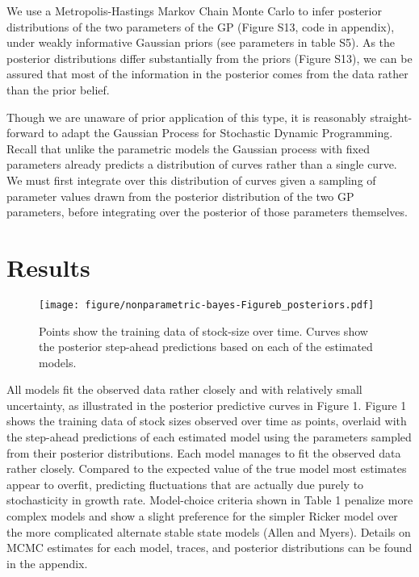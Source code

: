 \documentclass[author-year, review]{elsarticle} %
\makeatletter
\def\maxwidth{\ifdim\Gin@nat@width>\linewidth\linewidth
\else\Gin@nat@width\fi}
\let\Oldincludegraphics\includegraphics
\renewcommand{\includegraphics}[1]{\Oldincludegraphics[width=\maxwidth]{#1}}
\makeatother
\begin{document}
We use a Metropolis-Hastings Markov Chain Monte Carlo to infer posterior
distributions of the two parameters of the GP (Figure S13, code in
appendix), under weakly informative Gaussian priors (see parameters in
table S5). As the posterior distributions differ substantially from the
priors (Figure S13), we can be assured that most of the information in
the posterior comes from the data rather than the prior belief.

Though we are unaware of prior application of this type, it is
reasonably straight-forward to adapt the Gaussian Process for Stochastic
Dynamic Programming. Recall that unlike the parametric models the
Gaussian process with fixed parameters already predicts a distribution
of curves rather than a single curve. We must first integrate over this
distribution of curves given a sampling of parameter values drawn from
the posterior distribution of the two GP parameters, before integrating
over the posterior of those parameters themselves.

\section{Results}\label{results}

\begin{figure}[htbp]
\centering
\texttt{[image: figure/nonparametric-bayes-Figureb\_posteriors.pdf]}
\caption{Points show the training data of stock-size over time. Curves
show the posterior step-ahead predictions based on each of the estimated
models.}
\end{figure}

All models fit the observed data rather closely and with relatively
small uncertainty, as illustrated in the posterior predictive curves in
Figure 1. Figure 1 shows the training data of stock sizes observed over
time as points, overlaid with the step-ahead predictions of each
estimated model using the parameters sampled from their posterior
distributions. Each model manages to fit the observed data rather
closely. Compared to the expected value of the true model most estimates
appear to overfit, predicting fluctuations that are actually due purely
to stochasticity in growth rate. Model-choice criteria shown in Table 1
penalize more complex models and show a slight preference for the
simpler Ricker model over the more complicated alternate stable state
models (Allen and Myers). Details on MCMC estimates for each model,
traces, and posterior distributions can be found in the appendix.
\end{document}
